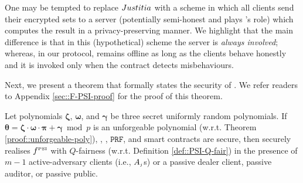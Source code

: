  
 
 
 
 

One may be tempted to replace ${Justitia}$ with a scheme in which all clients send their encrypted sets to a server (potentially semi-honest and plays \aud's role) which computes the result in a privacy-preserving manner.  We highlight that the main difference is that in this (hypothetical) scheme the server is \emph{always involved};  whereas, in our protocol, \aud remains offline as long as the clients behave honestly and it is invoked only when the contract detects misbehaviours.  
 
 
 Next, we present a theorem that formally states the security of \fpsi. We refer readers to Appendix \ref{sec::F-PSI-proof} for the proof of this theorem. 
 
 \vs
 
 \begin{theorem}\label{theorem::F-PSI-security}
Let polynomials $\bm\zeta$, $\bm\omega$, and $\bm\gamma$ be three secret uniformly random polynomials. If  $\bm\theta=\bm\zeta\cdot \bm\omega\cdot\bm \pi+\bm \gamma \bmod p$ is an unforgeable polynomial (w.r.t. Theorem \ref{proof::unforgeable-poly}), \zspaa, \vopr,  $\mathtt{PRF}$, and smart contracts are secure, then \fpsi securely realises  $f^{\scriptscriptstyle \text{PSI}}$ with $Q$-fairness (w.r.t. Definition \ref{def::PSI-Q-fair}) in the presence of $m-1$  active-adversary clients (i.e., $A_{\scriptscriptstyle j}$s) or a passive dealer client, passive auditor, or passive public. 
 \end{theorem}
 







 
 